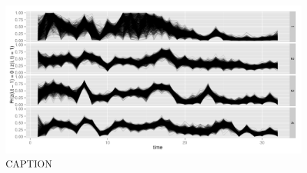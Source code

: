 \documentclass[12pt,letterpaper]{article}
\begin{document}

\begin{figure}[ht]
  \centering
  \includegraphics[width=\textwidth,height=0.5\textheight,keepaspectratio=true]{figure/turnover}
  \caption{CAPTION}
  \label{fig:turn}
\end{figure}

\end{document}
